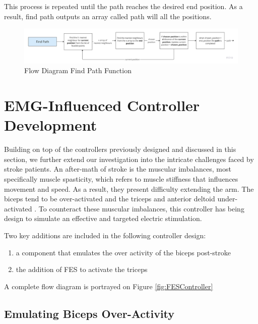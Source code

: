 This process is repeated until the path reaches the desired end position. As a result, find path outputs an array called path will all the positions.


\begin{figure}[h!]
    \centering
    \includegraphics[width=1\textwidth]{Pictures/Controller/findpath.jpg}
    \caption{Flow Diagram Find Path Function }
    \label{fig:FindPath}
\end{figure}


\newpage
\section{EMG-Influenced Controller Development}

Building on top of the controllers previously designed and discussed in this section, we further extend our investigation into the intricate challenges faced by stroke patients. An after-math of stroke is the muscular imbalances, most specifically muscle spasticity, which refers to muscle stiffness that influences movement and speed. As a result, they present difficulty extending the arm. The biceps tend to be over-activated and the triceps and anterior deltoid under-activated \cite{IOL}. To counteract these muscular imbalances, this controller has being design to simulate an effective and targeted electric stimulation. 

Two key additions are included in the following controller design:

\begin{enumerate}
    \item a component that emulates the over activity of the biceps post-stroke 
    \item the addition of FES to activate the triceps
\end{enumerate}

A complete flow diagram is portrayed on Figure \ref{fig:FESController}

\subsection{Emulating Biceps Over-Activity}

